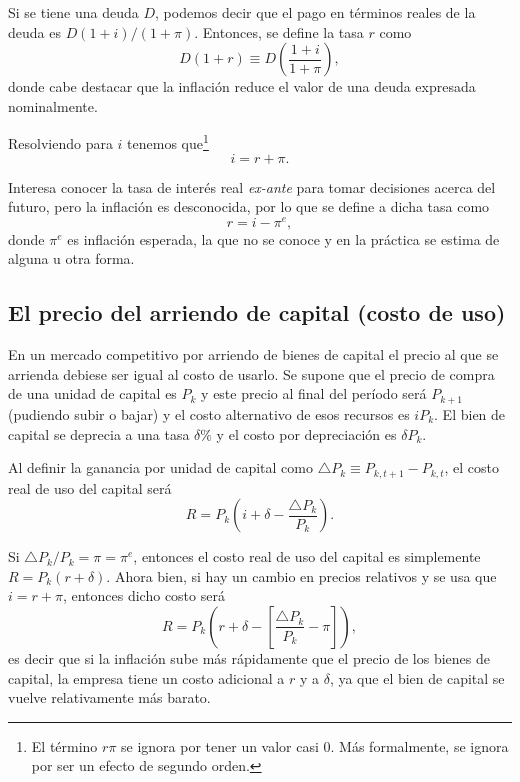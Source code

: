 \documentclass[DeGregorioResumen]{subfiles}
\begin{document}
Si se tiene una deuda $D$, podemos decir que el pago en términos reales de la deuda es $D(1+i)/(1+\pi)$. Entonces, se define la tasa $r$ como
\begin{equation*}
D(1+r) \equiv D\left(\frac{1+i}{1+\pi}\right),
\end{equation*}
donde cabe destacar que la inflación reduce el valor de una deuda expresada nominalmente.

Resolviendo para $i$ tenemos que\footnote{El término $r\pi$ se ignora por tener un valor casi 0. Más formalmente, se ignora por ser un efecto de segundo orden.}
\begin{equation}
i=r+\pi.
\end{equation}

Interesa conocer la tasa de interés real \textit{ex-ante} para tomar decisiones acerca del futuro, pero la inflación es desconocida, por lo que se define a dicha tasa como
\begin{equation*}
r=i-\pi^e,
\end{equation*}
donde $\pi^e$ es inflación esperada, la que no se conoce y en la práctica se estima de alguna u otra forma.

\subsection{El precio del arriendo de capital (costo de uso)}

En un mercado competitivo por arriendo de bienes de capital el precio al que se arrienda debiese ser igual al costo de usarlo. Se supone que el precio de compra de una unidad de capital es $P_k$ y este precio al final del período será $P_{k+1}$ (pudiendo subir o bajar) y el costo alternativo de esos recursos es $iP_k$. El bien de capital se deprecia a una tasa $\delta\% $ y el costo por depreciación es $\delta P_k$.

Al definir la ganancia por unidad de capital como $\bigtriangleup P_k \equiv P_{k,t+1}-P_{k,t}$, el costo real de uso del capital será
\begin{equation}
R= P_k \left (i+\delta - \frac{\bigtriangleup P_k}{P_k} \right).
\end{equation}

Si $\bigtriangleup P_k/P_k=\pi=\pi^e$, entonces el costo real de uso del capital es simplemente $R=P_k(r+\delta)$. Ahora bien, si hay un cambio en precios relativos y se usa que $i=r+\pi$, entonces dicho costo será
\begin{equation}
R = P_k \left(r+\delta-\left [\frac{\bigtriangleup P_k}{P_k}-\pi\right]\right),
\end{equation}
es decir que si la inflación sube más rápidamente que el precio de los bienes de capital, la empresa tiene un costo adicional a $r$ y a $\delta$, ya que el bien de capital se vuelve relativamente más barato.
\end{document}
